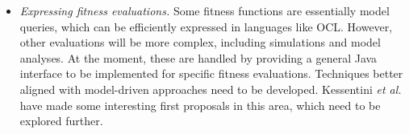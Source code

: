 \begin{itemize}
		\item \emph{Expressing fitness evaluations.} Some fitness functions are essentially model queries, which can be efficiently expressed in languages like OCL.
		      However, other evaluations will be more complex, including simulations and model analyses. At the moment, these are handled by providing a general Java
					interface to be implemented for specific fitness evaluations. Techniques better aligned with model-driven approaches need to be developed. Kessentini 
					\emph{et al.} \cite{Kessentini+13} have made some interesting first proposals in this area, which need to be explored further.
	\end{itemize}